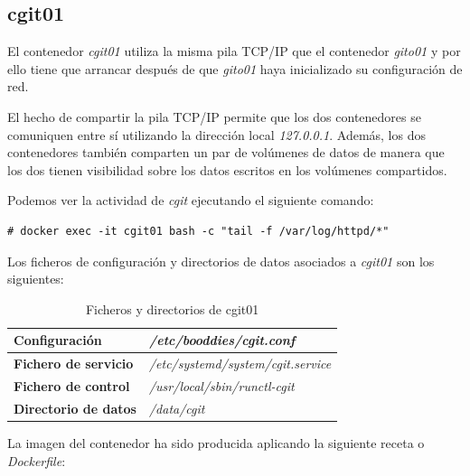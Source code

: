 \documentclass[a4paper,12pt,spanish,final]{epsc_tfc_pfc}
\begin{document}
\subsection{cgit01}

El contenedor \emph{cgit01} utiliza la misma pila TCP/IP que el contenedor \emph{gito01} y por ello tiene que arrancar después de que \emph{gito01} haya inicializado su configuración de red.

El hecho de compartir la pila TCP/IP permite que los dos contenedores se comuniquen entre sí utilizando la dirección local \emph{127.0.0.1}. Además, los dos contenedores también comparten un par de volúmenes de datos de manera que los dos tienen visibilidad sobre los datos escritos en los volúmenes compartidos.

Podemos ver la actividad de \emph{cgit} ejecutando el siguiente comando:\\

\begin{lstlisting}[style=dnsmasq]
# docker exec -it cgit01 bash -c "tail -f /var/log/httpd/*"
\end{lstlisting}

Los ficheros de configuración y directorios de datos asociados a \emph{cgit01} son los siguientes:

\begin{table}[h]

  \centering

  \begin{tabular}{ll}
    \toprule
    \textbf{Configuración}        & \textit{/etc/booddies/cgit.conf}          \\
    \midrule
    \rowcolor[HTML]{EFEFEF}
    \textbf{Fichero de servicio}  & \textit{/etc/systemd/system/cgit.service} \\
    \midrule
    \textbf{Fichero de control}   & \textit{/usr/local/sbin/runctl-cgit}      \\
    \midrule
    \rowcolor[HTML]{EFEFEF}
    \textbf{Directorio de datos}  & \textit{/data/cgit}                       \\
    \bottomrule
  \end{tabular}

  \caption{Ficheros y directorios de cgit01}

\end{table}

La imagen del contenedor ha sido producida aplicando la siguiente receta o \emph{Dockerfile}:\\
\end{document}
